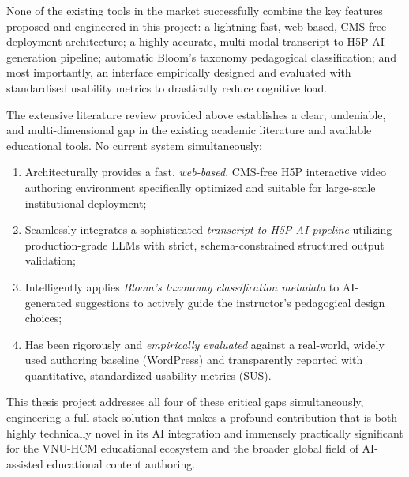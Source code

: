 None of the existing tools in the market successfully combine the key features proposed and engineered in this project: a lightning-fast, web-based, CMS-free deployment architecture; a highly accurate, multi-modal transcript-to-H5P AI generation pipeline; automatic Bloom's taxonomy pedagogical classification; and most importantly, an interface empirically designed and evaluated with standardised usability metrics to drastically reduce cognitive load.

The extensive literature review provided above establishes a clear, undeniable, and multi-dimensional gap in the existing academic literature and available educational tools. No current system simultaneously:

\begin{enumerate}
  \item Architecturally provides a fast, \emph{web-based}, CMS-free H5P interactive video authoring environment specifically optimized and suitable for large-scale institutional deployment;
  \item Seamlessly integrates a sophisticated \emph{transcript-to-H5P AI pipeline} utilizing production-grade LLMs with strict, schema-constrained structured output validation;
  \item Intelligently applies \emph{Bloom's taxonomy classification metadata} to AI-generated suggestions to actively guide the instructor's pedagogical design choices;
  \item Has been rigorously and \emph{empirically evaluated} against a real-world, widely used authoring baseline (WordPress) and transparently reported with quantitative, standardized usability metrics (SUS).
\end{enumerate}

This thesis project addresses all four of these critical gaps simultaneously, engineering a full-stack solution that makes a profound contribution that is both highly technically novel in its AI integration and immensely practically significant for the VNU-HCM educational ecosystem and the broader global field of AI-assisted educational content authoring.
